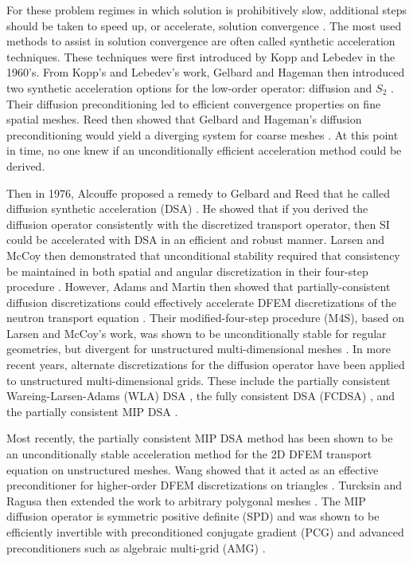 For these problem regimes in which solution is prohibitively slow, additional steps should be taken to speed up, or accelerate, solution convergence \cite{ref::adams_larsen_iter_methods}. The most used methods to assist in solution convergence are often called synthetic acceleration techniques. These techniques were first introduced by Kopp \cite{kopp1963synthetic} and Lebedev \cite{lebedevI,lebedevII,lebedevIII,lebedevIV,lebedevV,lebedevVI,lebedevVII} in the 1960's. From Kopp's and Lebedev's work, Gelbard and Hageman then introduced two synthetic acceleration options for the low-order operator: diffusion and $S_2$ \cite{gelbard1969synthetic}. Their diffusion preconditioning led to efficient convergence properties on fine spatial meshes. Reed then showed that Gelbard and Hageman's diffusion preconditioning would yield a diverging system for coarse meshes \cite{reed1971effectiveness}. At this point in time, no one knew if an unconditionally efficient acceleration method could be derived.

Then in 1976, Alcouffe proposed a remedy to Gelbard and Reed that he called diffusion synthetic acceleration (DSA) \cite{alcouffe1976stable,alcouffe1977DSA,alcouffe1977diffusion}. He showed that if you derived the diffusion operator consistently with the discretized transport operator, then SI could be accelerated with DSA in an efficient and robust manner. Larsen and McCoy then demonstrated that unconditional stability required that consistency be maintained in both spatial and angular discretization in their four-step procedure \cite{larsen1982unconditionally_I,larsen1982unconditionally_II}. However, Adams and Martin then showed that partially-consistent diffusion discretizations could effectively accelerate DFEM discretizations of the neutron transport equation \cite{ref::dsa_DFEM_adams_martin}. Their modified-four-step procedure (M4S), based on Larsen and McCoy's work, was shown to be unconditionally stable for regular geometries, but divergent for unstructured multi-dimensional meshes \cite{warsa2002fully}. In more recent years, alternate discretizations for the diffusion operator have been applied to unstructured multi-dimensional grids. These include the partially consistent Wareing-Larsen-Adams (WLA) DSA \cite{ref::WLA_DSA}, the fully consistent DSA (FCDSA) \cite{warsa2002fully}, and the partially consistent MIP DSA \cite{ref::DSA_wang_ragusa,wang2009adaptive,turcksin2014discontinuous}.

Most recently, the partially consistent MIP DSA method has been shown to be an unconditionally stable acceleration method for the 2D DFEM transport equation on unstructured meshes. Wang showed that it acted as an effective preconditioner for higher-order DFEM discretizations on triangles \cite{ref::DSA_wang_ragusa,wang2009adaptive}. Turcksin and Ragusa then extended the work to arbitrary polygonal meshes \cite{turcksin2014discontinuous}. The MIP diffusion operator is symmetric positive definite (SPD) and was shown to be efficiently invertible with preconditioned conjugate gradient (PCG) and advanced preconditioners such as algebraic multi-grid (AMG) \cite{turcksin2014discontinuous}.

